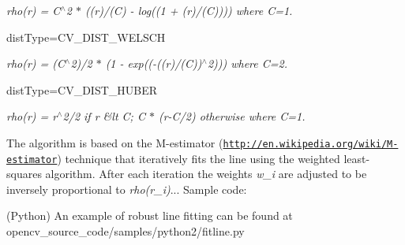 {\itshape rho(r) = C$^\wedge$2 $\ast$ ((r)/(C) -\/ log((1 + (r)/(C)))) where C=1.}


\begin{DoxyItemize}
\item dist\+Type=C\+V\+\_\+\+D\+I\+S\+T\+\_\+\+W\+E\+L\+S\+CH 
\end{DoxyItemize}

{\itshape rho(r) = (C$^\wedge$2)/2 $\ast$ (1 -\/ exp((-\/((r)/(C))$^\wedge$2))) where C=2.}


\begin{DoxyItemize}
\item dist\+Type=C\+V\+\_\+\+D\+I\+S\+T\+\_\+\+H\+U\+B\+ER 
\end{DoxyItemize}

{\itshape rho(r) = r$^\wedge$2/2 if r \&lt C; C $\ast$ (r-\/\+C/2) otherwise where C=1.}

The algorithm is based on the M-\/estimator (\href{http://en.wikipedia.org/wiki/M-estimator}{\tt http\+://en.\+wikipedia.\+org/wiki/\+M-\/estimator}) technique that iteratively fits the line using the weighted least-\/squares algorithm. After each iteration the weights {\itshape w\+\_\+i} are adjusted to be inversely proportional to {\itshape rho(r\+\_\+i)}... Sample code\+:


\begin{DoxyItemize}
\item (Python) An example of robust line fitting can be found at opencv\+\_\+source\+\_\+code/samples/python2/fitline.\+py 
\end{DoxyItemize}


